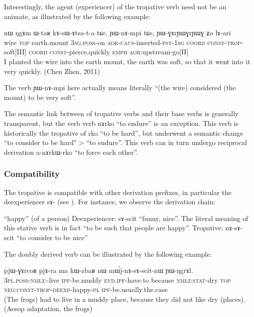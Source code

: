 \documentclass[oldfontcommands,oneside,a4paper,11pt]{memoir}
\newcommand{\ipa}[1]{{\phon #1}} %
\newcommand{\aor}{\textsc{aor}}
\newcommand{\caus}{\textsc{caus}}
\newcommand{\coord}{\textsc{coord}}
\newcommand{\const}{\textsc{const}}
\newcommand{\emphat}{\textsc{emph}}
\newcommand{\evd}{\textsc{evd}}
\newcommand{\ipf}{\textsc{ipf}}
\newcommand{\negat}{\textsc{neg}}
\newcommand{\nmlz}{\textsc{nmlz}}
\newcommand{\pl}{\textsc{pl}}
\newcommand{\poss}{\textsc{poss}}
\newcommand{\pst}{\textsc{pst}}
\newcommand{\sg}{\textsc{sg}}
\newcommand{\stat}{\textsc{stat}}
\newcommand{\topic}{\textsc{top}}
\newcommand{\trop}{\textsc{trop}}
\begin{document}
Interestingly, the agent (experiencer) of the tropative verb need not be an animate, as illustrated by the following example:
 \begin{exe}
\ex
\gll   \ipa{ɕomskrɯt} \ipa{nɯ} \ipa{ŋgɤm} \ipa{ɯ-taʁ} \ipa{kɤ-sɯ-ɤtsa-t-a} \ipa{tɕe}, \ipa{ɲɯ-nɤ-mpi} \ipa{tɕe}, \ipa{ɲɯ-ɣɤrɲɯɣrɲɯɣ} \ipa{ʑo} \ipa{lɤ-ari} \\
wire \topic{} earth.mount 3\sg{}.\poss{}-on \aor{}-\caus{}-inserted-\pst{}-1\sg{} \coord{} \const{}-\trop{}-soft[III] \coord{} \const{}-pierce.quickly \emphat{} \aor{}:upstream-go[II] \\
 \glt   I planted the wire into the earth mount,  the earth was soft, so that it went into it very quickly. (Chen Zhen, 2011)
\end{exe} 
 The verb \ipa{ɲɯ-nɤ-mpi} here actually means literally ``(the wire) considered (the mount) to be very soft''.

The semantic link between of tropative verbs and their base verbs is generally transparent, but the verb  verb \ipa{nɤrko} ``to endure'' is an exception. This verb is historically the tropative of \ipa{rko} ``to be hard'', but underwent a semantic change ``to consider to be hard" > ``to endure''. This verb can in turn undergo reciprocal derivation \ipa{a-nɤrkɯ-rko} ``to force each other''.
 
\subsubsection{Compatibility} \label{subsub:trop.compat}
The tropative is compatible with other derivation prefixes, in particular the deexperiencer \ipa{sɤ-} (see \citealt{jacques11demotion}). For instance, we observe the derivation chain:

 \begin{exe}
\ex
 \glt  \ipa{scit} ``happy'' (of a person)
 \glt Deexperiencer: \ipa{sɤ-scit} ``funny, nice''. The literal meaning of this stative verb is in fact ``to be such that people are happy''. 
 \glt Tropative: \ipa{nɤ-sɤ-scit} ``to consider to be nice''
\end{exe} 
The doubly derived verb can be illustrated by the following example:
 \begin{exe}
\ex
\gll   \ipa{nɯ-sɤ-rma} 	\ipa{pjɯ-ɣɤrcoʁ} 	\ipa{pjɤ-ra} 	\ipa{ma} 	\ipa{kɯ-zbaʁ} 	\ipa{nɯ} 	\ipa{mɯ́j-nɤ-sɤ-scit-nɯ} 	\ipa{ɲɯ-ŋgrɤl.} \\
 3\pl{}.\poss{}-\nmlz{}:\obl{}-live \ipf{}-be.muddy \evd{}.\ipf{}-have.to because \nmlz{}:\stat{}-dry \topic{} \negat{}:\const{}-\trop{}-\textsc{deexp}-happy-\pl{} \ipf{}-be.usually.the.case \\
 \glt   (The frogs)  had to live in a muddy place, because they did not like dry (places).  (Aesop adaptation, the frogs)
\end{exe} 
  
\end{document}

